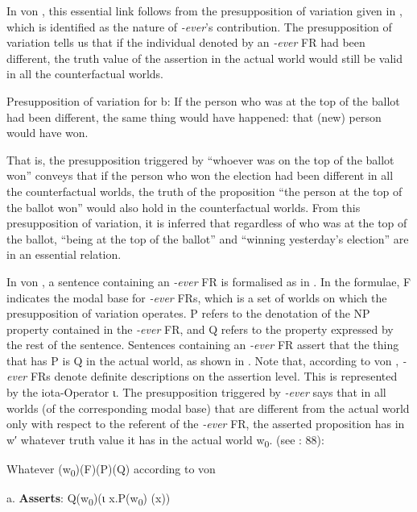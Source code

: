   In von \citet{Fintel2000}, this essential link follows from the presupposition of variation given in , which is identified as the nature of \textit{\nobreakdash-ever}’s contribution. The presupposition of variation tells us that if the individual denoted by an \textit{\nobreakdash-ever} FR had been different, the truth value of the assertion in the actual world would still be valid in all the counterfactual worlds.

\label{bkm:Ref533762335}  Presupposition of variation for b: If the person who was at the top of the ballot had been different, the same thing would have happened: that (new) person would have won.

That is, the presupposition triggered by “whoever was on the top of the ballot won” conveys that if the person who won the election had been different in all the counterfactual worlds, the truth of the proposition “the person at the top of the ballot won” would also hold in the counterfactual worlds. From this presupposition of variation, it is inferred that regardless of who was at the top of the ballot, “being at the top of the ballot” and “winning yesterday’s election” are in an essential relation.

  In von \citet{Fintel2000}, a sentence containing an \textit{\nobreakdash-ever} FR is formalised as in . In the formulae, F indicates the modal base for \textit{\nobreakdash-ever} FRs, which is a set of worlds on which the presupposition of variation operates. P refers to the denotation of the NP property contained in the \textit{\nobreakdash-ever} FR, and Q refers to the property expressed by the rest of the sentence. Sentences containing an \textit{\nobreakdash-ever} FR assert that the thing that has P is Q in the actual world, as shown in . Note that, according to von \citet{Fintel2000}, \textit{{}-ever} FRs denote definite descriptions on the assertion level. This is represented by the iota-Operator ι. The presupposition triggered by \textit{\nobreakdash-ever} says that in all worlds (of the corresponding modal base) that are different from the actual world only with respect to the referent of the \textit{\nobreakdash-ever} FR, the asserted proposition has in w′ whatever truth value it has in the actual world w\textsubscript{0}. (see \citealt{ChoiRomero2008}: 88):

\label{bkm:Ref533762404}  Whatever (w\textsubscript{0})(F)(P)(Q) according to von \citet{Fintel2000}

  a.  \textbf{Asserts}: Q(w\textsubscript{0})(ι x.P(w\textsubscript{0}) (x))

